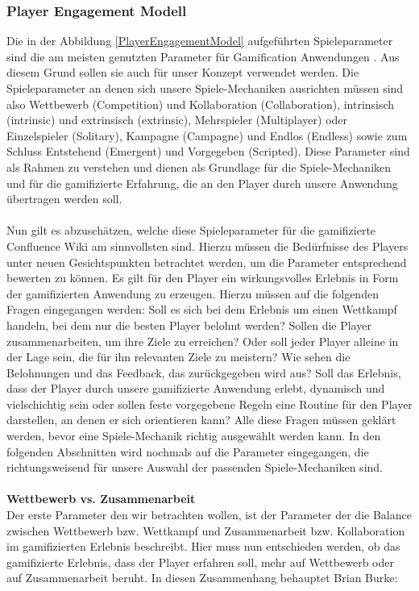 \documentclass[a4paper,12pt,twoside]{scrartcl}
\begin{document}
\subsubsection{Player Engagement Modell}
\label{Player Engagement Modell}
Die in der Abbildung \ref{PlayerEngagementModel} aufgeführten Spieleparameter sind die am meisten genutzten Parameter für Gamification Anwendungen \cite{gamificationDefinition}. Aus diesem Grund sollen sie auch für unser Konzept verwendet werden. Die Spieleparameter an denen sich unsere Spiele-Mechaniken ausrichten müssen sind also Wettbewerb (Competition) und Kollaboration (Collaboration), intrinsisch (intrinsic) und extrinsisch (extrinsic), Mehrspieler (Multiplayer) oder Einzelspieler (Solitary), Kampagne (Campagne) und Endlos (Endless) sowie zum Schluss Entstehend (Emergent) und Vorgegeben (Scripted). Diese Parameter sind als Rahmen zu verstehen und dienen als Grundlage für die Spiele-Mechaniken und für die gamifizierte Erfahrung, die an den Player durch unsere Anwendung übertragen werden soll. 
\\\\
Nun gilt es abzuschätzen, welche diese Spieleparameter für die gamifizierte Confluence Wiki am sinnvollsten sind. Hierzu müssen die Bedürfnisse des Players unter neuen Gesichtspunkten betrachtet werden, um die Parameter entsprechend bewerten zu können. Es gilt für den Player ein wirkungsvolles Erlebnis in Form der gamifizierten Anwendung zu erzeugen. Hierzu müssen auf die folgenden Fragen eingegangen werden: Soll es sich bei dem Erlebnis um einen Wettkampf handeln, bei dem nur die besten Player belohnt werden? Sollen die Player zusammenarbeiten, um ihre Ziele zu erreichen? Oder soll jeder Player alleine in der Lage sein, die für ihn relevanten Ziele zu meistern? Wie sehen die Belohnungen und das Feedback, das zurückgegeben wird aus? Soll das Erlebnis, dass der Player durch unsere gamifizierte Anwendung erlebt, dynamisch und vielschichtig sein oder sollen feste vorgegebene Regeln eine Routine für den Player darstellen, an denen er sich orientieren kann? Alle diese Fragen müssen geklärt werden, bevor eine Spiele-Mechanik richtig ausgewählt werden kann. In den folgenden Abschnitten wird nochmals auf die Parameter eingegangen, die richtungsweisend für unsere Auswahl der passenden Spiele-Mechaniken sind.
\\\\
\textbf{Wettbewerb vs. Zusammenarbeit}\\
Der erste Parameter den wir betrachten wollen, ist der Parameter der die Balance zwischen Wettbewerb bzw. Wettkampf und Zusammenarbeit bzw. Kollaboration im gamifizierten Erlebnis beschreibt. Hier muss nun entschieden werden, ob das gamifizierte Erlebnis, dass der Player erfahren soll, mehr auf Wettbewerb oder auf Zusammenarbeit beruht. In diesen Zusammenhang behauptet Brian Burke:
\end{document}
